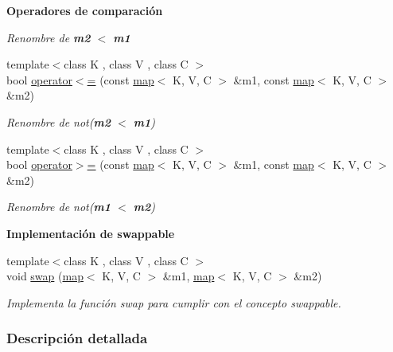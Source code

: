 \begin{Indent}{\bf \-Operadores de comparación}
\begin{DoxyCompactItemize}
\begin{DoxyCompactList}\small\item\em \-Renombre de {\bfseries m2} $<$ {\bfseries m1} \end{DoxyCompactList}\item 
{\footnotesize template$<$class K , class V , class C $>$ }\\bool \hyperlink{classaed2_1_1map_afe374b37f17263d0cad3ee19a590d208_afe374b37f17263d0cad3ee19a590d208}{operator$<$=} (const \hyperlink{classaed2_1_1map}{map}$<$ \-K, \-V, \-C $>$ \&m1, const \hyperlink{classaed2_1_1map}{map}$<$ \-K, \-V, \-C $>$ \&m2)
\begin{DoxyCompactList}\small\item\em \-Renombre de not({\bfseries m2} $<$ {\bfseries m1}) \end{DoxyCompactList}\item 
{\footnotesize template$<$class K , class V , class C $>$ }\\bool \hyperlink{classaed2_1_1map_a093a6d1a055339c5fc6297a1d47a9159_a093a6d1a055339c5fc6297a1d47a9159}{operator$>$=} (const \hyperlink{classaed2_1_1map}{map}$<$ \-K, \-V, \-C $>$ \&m1, const \hyperlink{classaed2_1_1map}{map}$<$ \-K, \-V, \-C $>$ \&m2)
\begin{DoxyCompactList}\small\item\em \-Renombre de not({\bfseries m1} $<$ {\bfseries m2}) \end{DoxyCompactList}\end{DoxyCompactItemize}
\end{Indent}
\begin{Indent}{\bf \-Implementación de swappable}\par
\begin{DoxyCompactItemize}
\item 
{\footnotesize template$<$class K , class V , class C $>$ }\\void \hyperlink{classaed2_1_1map_a119cb2938bbc11c25ebd4fb824782a72_a119cb2938bbc11c25ebd4fb824782a72}{swap} (\hyperlink{classaed2_1_1map}{map}$<$ \-K, \-V, \-C $>$ \&m1, \hyperlink{classaed2_1_1map}{map}$<$ \-K, \-V, \-C $>$ \&m2)
\begin{DoxyCompactList}\small\item\em \-Implementa la función swap para cumplir con el concepto swappable. \end{DoxyCompactList}\end{DoxyCompactItemize}
\end{Indent}


\subsubsection{\-Descripción detallada}
